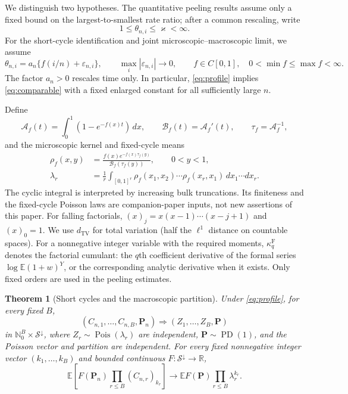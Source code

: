 \documentclass[11pt]{article}
\numberwithin{equation}{section}
\newcommand{\E}{\mathbb E}
\newcommand{\Pois}{\operatorname{Pois}}
\newcommand{\PD}{\operatorname{PD}}
\newtheorem{theorem}{Theorem}[section]
\theoremstyle{definition}
\theoremstyle{remark}
\begin{document}
We distinguish two hypotheses.  The quantitative peeling results assume
only a fixed bound on the largest-to-smallest rate ratio; after a common
rescaling, write
\begin{equation}\label{eq:comparable}
 1\le\theta_{n,i}\le\varkappa<\infty.
\end{equation}
For the short-cycle identification and joint microscopic--macroscopic
limit, we assume
\begin{equation}\label{eq:profile}
 \theta_{n,i}=a_n\{f(i/n)+\varepsilon_{n,i}\},\qquad
 \max_i|\varepsilon_{n,i}|\longrightarrow0,\qquad
 f\in C[0,1],\quad 0<\min f\le\max f<\infty.
\end{equation}
The factor $a_n>0$ rescales time only.  In particular,
\eqref{eq:profile} implies \eqref{eq:comparable} with a fixed enlarged
constant for all sufficiently large $n$.

Define
\[
 \mathcal A_f(t)=\int_0^1(1-e^{-f(x)t})\,dx,\qquad
 \mathcal B_f(t)=\mathcal A_f'(t),\qquad \tau_f=\mathcal A_f^{-1},
\]
and the microscopic kernel and fixed-cycle means
\begin{align}
 \rho_f(x,y)&=\frac{f(x)e^{-f(x)\tau_f(y)}}{\mathcal B_f(\tau_f(y))},
       \qquad 0<y<1,\label{eq:rho}\\
 \lambda_r&=\frac1r\int_{[0,1]^r}
     \rho_f(x_1,x_2)\cdots\rho_f(x_r,x_1)\,dx_1\cdots dx_r.
     \label{eq:lambda}
\end{align}
The cyclic integral is interpreted by increasing bulk truncations.
Its finiteness and the fixed-cycle Poisson laws are companion-paper inputs,
not new assertions of this paper.
For falling factorials, $(x)_j=x(x-1)\cdots(x-j+1)$ and $(x)_0=1$.
We use $d_{\mathrm{TV}}$ for total variation (half the $\ell^1$ distance
on countable spaces).  For a nonnegative integer variable with the required
moments, $\kappa_q^{\mathrm F}$ denotes the factorial cumulant: the
$q$th coefficient derivative of the formal series
$\log\E(1+w)^Y$, or the corresponding analytic derivative when it exists.
Only fixed orders are used in the peeling estimates.

\begin{theorem}[Short cycles and the macroscopic partition]
\label{prop:micro-macro}
Under \eqref{eq:profile}, for every fixed $B$,
\[
 (C_{n,1},\ldots,C_{n,B},\mathbf P_n)
 \Longrightarrow (Z_1,\ldots,Z_B,\mathbf P)
\]
in $\mathbb N_0^B\times\mathcal S^\downarrow$, where
$Z_r\sim\Pois(\lambda_r)$ are independent, $\mathbf P\sim\PD(1)$,
and the Poisson vector and partition are independent.
For every fixed nonnegative integer vector $(k_1,\ldots,k_B)$ and
bounded continuous $F:\mathcal S^\downarrow\to\mathbb R$,
\begin{equation}\label{eq:micro-macro-factorization}
 \E\left[F(\mathbf P_n)\prod_{r\le B}(C_{n,r})_{k_r}\right]
 \longrightarrow \E F(\mathbf P)\prod_{r\le B}\lambda_r^{k_r}.
\end{equation}
\end{theorem}
\end{document}
